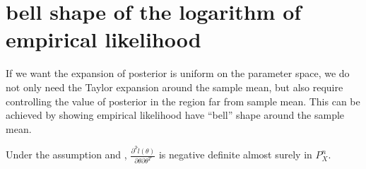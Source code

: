 \section{bell shape of the logarithm of empirical likelihood}

If we want the expansion of posterior is uniform on the parameter
space, we do not only need the Taylor expansion around the sample
mean, but also require controlling the value of posterior in the region
far from sample mean. This can be achieved by showing empirical likelihood
have ``bell'' shape around the sample mean. 
\begin{lem}
\label{lem:second-order-der-neg-def}Under the assumption 
and , $\frac{\partial^{2}\hat{l}\left(\theta\right)}{\partial\theta\partial\theta^{T}}$
is negative definite almost surely in $P_{X}^{n}$. \end{lem}
